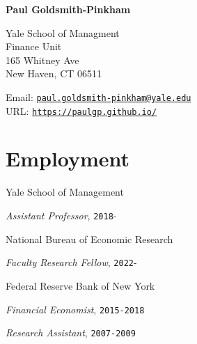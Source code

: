\documentclass[letterpaper]{article}
\renewenvironment{itemize}{
  \begin{list}{}
    { \setlength{\itemsep}{5pt}
      \setlength{\parsep}{0pt}
      \setlength{\topsep}{0pt}
      \setlength{\leftmargin}{0em} } }{
  \end{list}}
\begin{document}
{\huge\bf  Paul Goldsmith-Pinkham}

\bigskip

Yale School of Managment\\
Finance Unit\\
165 Whitney Ave\\
New Haven, CT 06511
\medskip



Email: \href{mailto:paul.goldsmith-pinkham@yale.edu}{\tt paul.goldsmith-pinkham@yale.edu} \\
URL: \href{http://https://paulgp.github.io//}{\tt https://paulgp.github.io/} 

\section*{Employment}
\begin{itemize}
\item Yale School of Management
  \begin{itemize}
  \item \qquad \textit{Assistant Professor}, \texttt{2018}-
  \end{itemize}  
\item National Bureau of Economic Research
  \begin{itemize}
  \item \qquad \textit{Faculty Research Fellow}, \texttt{2022}-
  \end{itemize}  
\item Federal Reserve Bank of New York
  \begin{itemize}
  \item \qquad \textit{Financial Economist}, \texttt{2015-2018}
  \item \qquad \textit{Research Assistant}, \texttt{2007-2009}
  \end{itemize}
\end{itemize}
\end{document}
